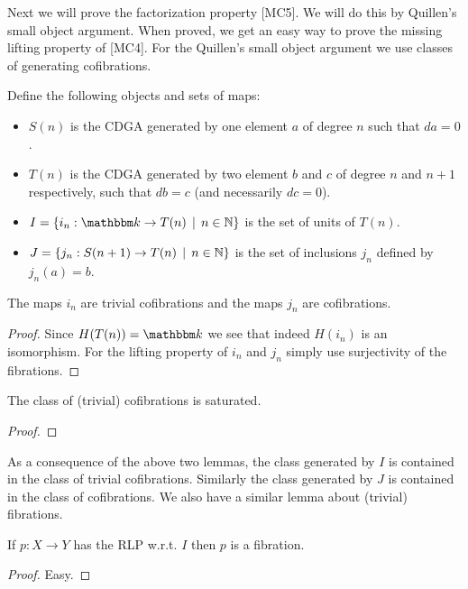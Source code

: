 Next we will prove the factorization property [MC5]. We will do this by Quillen's small object argument. When proved, we get an easy way to prove the missing lifting property of [MC4]. For the Quillen's small object argument we use classes of generating cofibrations.

\begin{definition}
	Define the following objects and sets of maps:
	\begin{itemize}
		\item $S(n)$ is the CDGA generated by one element $a$ of degree $n$ such that $da = 0$.
		\item $T(n)$ is the CDGA generated by two element $b$ and $c$ of degree $n$ and $n+1$ respectively, such that $db = c$ (and necessarily $dc = 0$).
		\item $I = \{ i_n: \k \to T(n) \I n \in \N \}$ is the set of units of $T(n)$.
		\item $J = \{ j_n: S(n+1) \to T(n) \,\mid\, n \in \mathbb{N} \}$ is the set of inclusions $j_n$ defined by $j_n(a) = b$.
	\end{itemize}
\end{definition}

\begin{lemma}
	The maps $i_n$ are trivial cofibrations and the maps $j_n$ are cofibrations.
\end{lemma}
\begin{proof}
	Since $H(T(n)) = \k$ we see that indeed $H(i_n)$ is an isomorphism. For the lifting property of $i_n$ and $j_n$ simply use surjectivity of the fibrations. 
\end{proof}

\begin{lemma}
	The class of (trivial) cofibrations is saturated.
\end{lemma}
\begin{proof}
\end{proof}

As a consequence of the above two lemmas, the class generated by $I$ is contained in the class of trivial cofibrations. Similarly the class generated by $J$ is contained in the class of cofibrations. We also have a similar lemma about (trivial) fibrations.

\begin{lemma}
	If $p: X \to Y$ has the RLP w.r.t. $I$ then $p$ is a fibration.
\end{lemma}
\begin{proof}
	Easy.
\end{proof}

